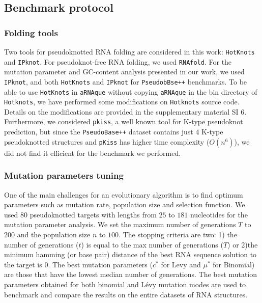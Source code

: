 \subsection{Benchmark protocol}
\subsubsection*{Folding tools}
Two tools for pseudoknotted RNA folding are considered in this work: \texttt{HotKnots} and \texttt{IPknot}. For pseudoknot-free RNA folding, we used \texttt{RNAfold}.
 For the mutation parameter and GC-content analysis presented in our work, we used \texttt{IPknot}, and both \texttt{HotKnots} and \texttt{IPknot} for \texttt{PseudobBse++} benchmarks. To be able to use \texttt{HotKnots} in \texttt{aRNAque} without copying \texttt{aRNAque} in the bin directory of \texttt{Hotknots}, we have performed some modifications on \texttt{Hotknots} source code. Details on the modifications are provided in the supplementary material SI 6. Furthermore, we considered \texttt{pkiss}, a well known tool for K-type pseudoknot prediction, but since the \texttt{PseudoBase++} dataset contains just $4$ K-type pseudoknotted structures and \texttt{pKiss} has higher time complexity ($O(n^6)$), we did not find it efficient for the benchmark we performed.
\subsubsection*{Mutation parameters tuning}
One of the main challenges for an evolutionary algorithm is to find optimum parameters such as mutation rate, population size and selection function.
We used $80$ pseudoknotted targets with lengths from $25$ to $181$ nucleotides for the mutation parameter analysis. We set the maximum number of generations $T$ to $200$ and the population size $n$ to $100$. The stopping criteria are two: 1) the number of generations ($t$) is equal to the max number of generations ($T$) or 2)the minimum hamming (or base pair) distance of the best RNA sequence solution to the target is $0$. The best mutation parameters ($c^*$ for Levy and $\mu^*$ for Binomial) are those that have the lowest median number of generations. The best mutation parameters obtained for both binomial and Lévy mutation modes are used to benchmark and compare the results on the entire datasets of RNA structures.
